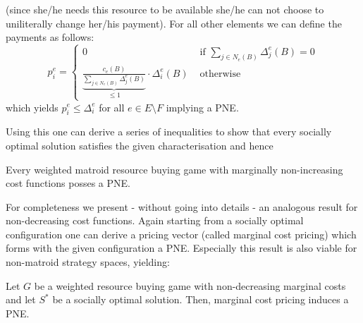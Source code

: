 \documentclass{scrartcl}
\theoremstyle{nonumberplain}
\begin{document}
(since she/he needs this resource to be available she/he can not choose to
uniliterally change her/his payment). For all other elements we can define the
payments as follows:
\begin{equation*}
  p_{i}^{e} = \begin{cases}
    0 &\text{ if } \sum_{j\in N_{e}(B)}\Delta_{j}^{e}(B) = 0\\
    \underbrace{
      \frac{c_{e}(B)}{\sum_{j\in N_{e}(B)}\Delta_{j}^{e}(B)}
    }_{\leq 1}\cdot\Delta_{i}^{e}(B) &\text{ otherwise}
  \end{cases}
\end{equation*}
which yields $p_{i}^{e}\leq \Delta_{i}^{e}$ for all $e\in E\setminus F$
implying a PNE.

Using this one can derive a series of inequalities to show that every socially
optimal solution satisfies the given characterisation and hence
\begin{theo}
  Every weighted matroid resource buying game with marginally non-increasing
  cost functions posses a PNE.
\end{theo}
For completeness we present - without going into details - an analogous result
for non-decreasing cost functions. Again starting from a socially optimal
configuration one can derive a pricing vector (called marginal cost pricing)
which forms with the given configuration a PNE. Especially this result is
also viable for non-matroid strategy spaces, yielding:
\begin{theo}
  Let $G$ be a weighted resource buying game with non-decreasing marginal costs
  and let $S^{\ast}$ be a socially optimal solution. Then, marginal cost
  pricing induces a PNE.
\end{theo}

\todos
\end{document}
